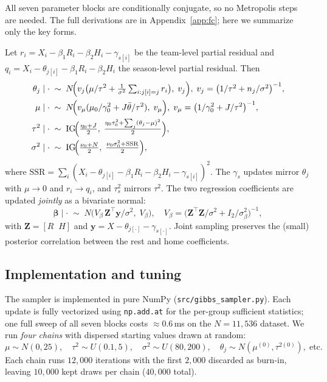 \documentclass[11pt]{article}
\newcommand{\IG}{\mathrm{IG}}
\begin{document}
All seven parameter blocks are conditionally conjugate, so no Metropolis steps
are needed. The full derivations are in Appendix~\ref{app:fc}; here we summarize
only the key forms.

Let $r_i = X_i - \beta_1 R_i - \beta_2 H_i - \gamma_{s[i]}$ be the team-level
partial residual and $q_i = X_i - \theta_{j[i]} - \beta_1 R_i - \beta_2 H_i$
the season-level partial residual. Then
\begin{align*}
\theta_j \mid \cdot \;&\sim\; N\!\Bigl(v_j\bigl(\mu/\tau^2 + \tfrac{1}{\sigma^2}\textstyle\sum_{i:j[i]=j} r_i\bigr),\; v_j\Bigr),\;
   v_j = \bigl(1/\tau^2 + n_j/\sigma^2\bigr)^{-1},\\
\mu \mid \cdot \;&\sim\; N\!\Bigl(v_\mu(\mu_0/\gamma_0^2 + J\bar\theta/\tau^2),\; v_\mu\Bigr),\;
   v_\mu = \bigl(1/\gamma_0^2 + J/\tau^2\bigr)^{-1},\\
\tau^2 \mid \cdot \;&\sim\; \IG\!\Bigl(\tfrac{\eta_0+J}{2},\;\tfrac{\eta_0\tau_0^2 + \sum_j(\theta_j-\mu)^2}{2}\Bigr),\\
\sigma^2 \mid \cdot \;&\sim\; \IG\!\Bigl(\tfrac{\nu_0+N}{2},\;\tfrac{\nu_0\sigma_0^2 + \mathrm{SSR}}{2}\Bigr),
\end{align*}
where $\mathrm{SSR} = \sum_i (X_i - \theta_{j[i]} - \beta_1 R_i - \beta_2 H_i - \gamma_{s[i]})^2$.
The $\gamma_s$ updates mirror $\theta_j$ with $\mu \to 0$ and $r_i \to q_i$,
and $\tau_s^2$ mirrors $\tau^2$. The two regression coefficients are updated
\emph{jointly} as a bivariate normal:
\[
\boldsymbol{\beta} \mid \cdot \;\sim\; N\!\bigl(V_\beta\, \mathbf{Z}^\top \mathbf{y}/\sigma^2,\; V_\beta\bigr),\quad
V_\beta = \bigl(\mathbf{Z}^\top \mathbf{Z}/\sigma^2 + I_2/\sigma_\beta^2\bigr)^{-1},
\]
with $\mathbf{Z} = [R\;\;H]$ and $\mathbf{y} = X - \theta_{j[\cdot]} - \gamma_{s[\cdot]}$.
Joint sampling preserves the (small) posterior correlation between the rest and home
coefficients.

\subsection{Implementation and tuning}

The sampler is implemented in pure NumPy (\texttt{src/gibbs\_sampler.py}). Each
update is fully vectorized using \texttt{np.add.at} for the per-group sufficient
statistics; one full sweep of all seven blocks costs $\approx 0.6$\,ms on the
$N = 11{,}536$ dataset. We run \emph{four chains} with dispersed starting
values drawn at random:
\[
\mu \sim N(0, 25),\quad \tau^2 \sim U(0.1, 5),\quad \sigma^2 \sim U(80, 200),\quad
\theta_j \sim N(\mu^{(0)}, \tau^{2(0)}),\;\text{etc.}
\]
Each chain runs $12{,}000$ iterations with the first $2{,}000$ discarded as
burn-in, leaving $10{,}000$ kept draws per chain ($40{,}000$ total).
\end{document}
